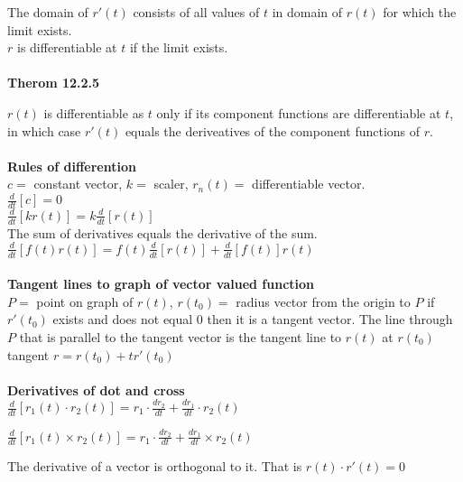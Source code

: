 \documentclass[14pt]{extreport}
\begin{document}
The domain of $r'(t)$ consists of all values of $t$ in domain of $r(t)$ for which the limit exists.\\

$r$ is differentiable at $t$ if the limit exists.\\\\

\textbf{Therom 12.2.5}

$r(t)$ is differentiable as $t$ only if its component functions are differentiable at $t$, in which case $r'(t)$ equals the deriveatives of the component functions of $r$.\\\\

\textbf{Rules of differention}\\

$c=$ constant vector, $k=$ scaler, $r_n(t)=$ differentiable vector.\\

$\frac{d}{dt}[c]=0$\\

$\frac{d}{dt}[kr(t)]=k\frac{d}{dt}[r(t)]$\\

The sum of derivatives equals the derivative of the sum.\\

$\frac{d}{dt}[f(t)r(t)]=f(t)\frac{d}{dt}[r(t)] + \frac{d}{dt}[f(t)]r(t)$\\\\

\textbf{Tangent lines to graph of vector valued function}\\

$P=$ point on graph of $r(t)$, $r(t_0)=$ radius vector from the origin to $P$ if $r'(t_0)$ exists and does not equal $0$ then it is a tangent vector. The line through $P$ that is parallel to the tangent vector is the tangent line to $r(t)$ at $r(t_0)$\\

tangent $r = r(t_0) + tr'(t_0)$\\\\

\textbf{Derivatives of dot and cross}\\

$\frac{d}{dt}[r_1(t) \cdot r_2(t)] = r_1 \cdot \frac{dr_2}{dt} + \frac{dr_1}{dt} \cdot r_2(t)$

$\frac{d}{dt}[r_1(t) \times r_2(t)] = r_1 \cdot \frac{dr_2}{dt} + \frac{dr_1}{dt} \times r_2(t)$


The derivative of a vector is orthogonal to it. That is $r(t) \cdot r'(t) = 0$\\\\
\end{document}
